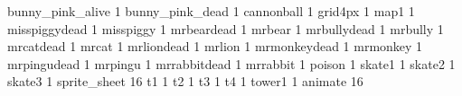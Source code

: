 bunny_pink_alive 1
bunny_pink_dead 1
cannonball 1
grid4px 1
map1 1
misspiggydead 1
misspiggy 1
mrbeardead 1
mrbear 1
mrbullydead 1
mrbully 1
mrcatdead 1
mrcat 1
mrliondead 1
mrlion 1
mrmonkeydead 1
mrmonkey 1
mrpingudead 1
mrpingu 1
mrrabbitdead 1
mrrabbit 1
poison 1
skate1 1
skate2 1
skate3 1
sprite_sheet 16
t1 1
t2 1
t3 1
t4 1
tower1 1
animate 16


